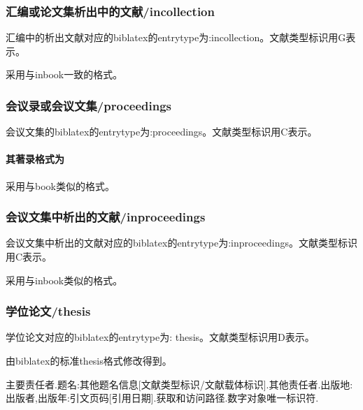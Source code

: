 \subsubsection{汇编或论文集析出中的文献/incollection}
\begin{refentry}{}{}
汇编中的析出文献对应的biblatex的entrytype为:incollection。文献类型标识用G表示。

 采用与inbook一致的格式。
\end{refentry}

\subsubsection{会议录或会议文集/proceedings}
\begin{refentry}{}{}
会议文集的biblatex的entrytype为:proceedings。文献类型标识用C表示。

\paragraph{其著录格式为} 采用与book类似的格式。
\end{refentry}

\subsubsection{会议文集中析出的文献/inproceedings}
\begin{refentry}{}{}
会议文集中析出的文献对应的biblatex的entrytype为:inproceedings。文献类型标识用C表示。

 采用与inbook类似的格式。
\end{refentry}

\subsubsection{学位论文/thesis}
\begin{refentry}{}{}
学位论文对应的biblatex的entrytype为: thesis。文献类型标识用D表示。

 由biblatex的标准thesis格式修改得到。

主要责任者.题名:其他题名信息[文献类型标识/文献载体标识].其他责任者.出版地:出版者,出版年:引文页码[引用日期].获取和访问路径.数字对象唯一标识符.
\end{refentry}

